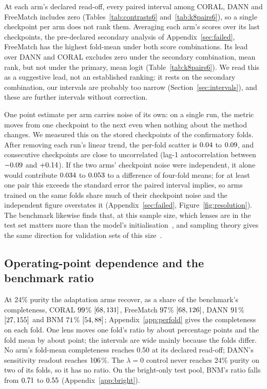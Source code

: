 At each arm's declared read-off, every paired interval among CORAL, DANN and FreeMatch includes
zero (Tables~\ref{tab:contrasts6} and~\ref{tab:k8pairs6}), so a single checkpoint per arm does
not rank them. Averaging each arm's scores over its last \rwFiveKWord{} checkpoints, the
pre-declared secondary analysis of Appendix~\ref{sec:failed}, FreeMatch has the highest
fold-mean under both score combinations. Its lead over DANN and CORAL excludes zero under the
secondary combination, mean rank, but not under the primary, mean logit
(Table~\ref{tab:k8pairs6}). We read this as a suggestive lead, not an established ranking: it
rests on the secondary combination, our intervals are probably too narrow
(Section~\ref{sec:intervals}), and these are further intervals without correction.

One point estimate per arm carries noise of its own: on a single run, the metric moves from one
checkpoint to the next even when nothing about the method changes. We measured this on the
stored checkpoints of the confirmatory folds. After removing each run's linear trend, the
per-fold scatter is $0.04{}$ to $0.09{}$, and consecutive checkpoints are close
to uncorrelated (lag-1 autocorrelation between $-0.09{}$ and $+0.14{}$). If the two
arms' checkpoint noise were independent, it alone would contribute $0.034{}$ to
$0.053{}$ to a difference of four-fold means; for at least one pair this exceeds the
standard error the paired interval implies, so arms trained on the same folds share much of
their checkpoint noise and the independent figure overstates it
(Appendix~\ref{sec:failed}, Figure~\ref{fig:resolution}). The benchmark likewise finds that, at
this sample size, which lenses are in the test set matters more than the model's
initialisation~\citep{lines2025simstosky}, and sampling theory gives the same direction for
validation sets of this size~\citep{oliver2018realistic}.

\subsection{Operating-point dependence and the benchmark ratio}
\label{sec:results-operating-point}

At 24\% purity the adaptation arms recover, as a share of the benchmark's completeness, CORAL
$99{}$\% $[68{}, 131{}]$, FreeMatch $97{}$\%
$[68{}, 126{}]$, DANN $91{}$\% $[27{}, 155{}]$
and BNM $71{}$\% $[54{}, 88{}]$; Appendix~\ref{app:perfold} gives the
completeness on each fold. One lens moves one fold's ratio by about \dlLensFoldPpWord{}
percentage points and the fold mean by about \dlLensMeanPpWord{} point; the intervals are wide
mainly because the folds differ. No arm's
fold-mean completeness reaches 0.50 at its declared read-off; DANN's sensitivity readout reaches
$106{}$\%. The $\lambda=0$ control never reaches 24\% purity on two of its folds, so
it has no ratio. On the bright-only test pool, BNM's ratio falls from $0.71{}$ to
$0.55{}$ (Appendix~\ref{app:bright}).

